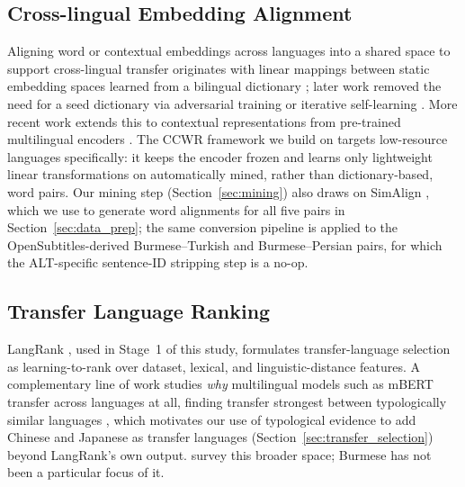 \documentclass[11pt]{article}
\begin{document}
\subsection{Cross-lingual Embedding Alignment} 
Aligning word or contextual embeddings across languages into a shared space to support cross-lingual transfer originates with linear mappings between static embedding spaces learned from a bilingual dictionary \citep{mikolov-etal-2013-exploiting}; later work removed the need for a seed dictionary via adversarial training \citep{conneau2018word} or iterative self-learning \citep{artetxe-etal-2018-robust}. More recent work extends this to contextual representations from pre-trained multilingual encoders \citep{schuster-etal-2019-cross}. The CCWR framework we build on \citep{hangya-etal-2022-improving} targets low-resource languages specifically: it keeps the encoder frozen and learns only lightweight linear transformations on automatically mined, rather than dictionary-based, word pairs. Our mining step (Section~\ref{sec:mining}) also draws on SimAlign \citep{jalili-sabet-etal-2020-simalign}, which we use to generate word alignments for all five pairs in Section~\ref{sec:data_prep}; the same conversion pipeline is applied to the OpenSubtitles-derived Burmese--Turkish and Burmese--Persian pairs, for which the ALT-specific sentence-ID stripping step is a no-op.

\subsection{Transfer Language Ranking} 
LangRank \citep{lin-etal-2019-choosing}, used in Stage~1 of this study, formulates transfer-language selection as learning-to-rank over dataset, lexical, and linguistic-distance features. A complementary line of work studies \emph{why} multilingual models such as mBERT transfer across languages at all, finding transfer strongest between typologically similar languages \citep{pires-etal-2019-multilingual,karthikeyan-etal-2020-cross}, which motivates our use of typological evidence to add Chinese and Japanese as transfer languages (Section~\ref{sec:transfer_selection}) beyond LangRank's own output. \citet{ruder-etal-2019-survey} survey this broader space; Burmese has not been a particular focus of it.
\end{document}
